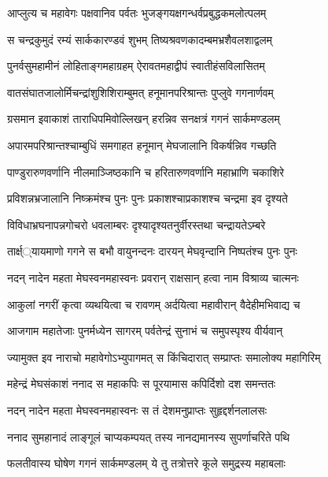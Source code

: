 
\twolineshloka
{आप्लुत्य च महावेगः पक्षवानिव पर्वतः}
{भुजङ्गयक्षगन्धर्वप्रबुद्धकमलोत्पलम्} %

\twolineshloka
{स चन्द्रकुमुदं रम्यं सार्ककारण्डवं शुभम्}
{तिष्यश्रवणकादम्बमभ्रशैवलशाद्वलम्} %

\twolineshloka
{पुनर्वसुमहामीनं लोहिताङ्गमहाग्रहम्}
{ऐरावतमहाद्वीपं स्वातीहंसविलासितम्} %

\twolineshloka
{वातसंघातजालोर्मिचन्द्रांशुशिशिराम्बुमत्}
{हनूमानपरिश्रान्तः पुप्लुवे गगनार्णवम्} %

\twolineshloka
{ग्रसमान इवाकाशं ताराधिपमिवोल्लिखन्}
{हरन्निव सनक्षत्रं गगनं सार्कमण्डलम्} %

\twolineshloka
{अपारमपरिश्रान्तश्चाम्बुधिं समगाहत}
{हनूमान् मेघजालानि विकर्षन्निव गच्छति} %

\twolineshloka
{पाण्डुरारुणवर्णानि नीलमाञ्जिष्ठकानि च}
{हरितारुणवर्णानि महाभ्राणि चकाशिरे} %

\twolineshloka
{प्रविशन्नभ्रजालानि निष्क्रमंश्च पुनः पुनः}
{प्रकाशश्चाप्रकाशश्च चन्द्रमा इव दृश्यते} %

\twolineshloka
{विविधाभ्रघनापन्नगोचरो धवलाम्बरः}
{दृश्यादृश्यतनुर्वीरस्तथा चन्द्रायतेऽम्बरे} %

\twolineshloka
{तार्क्ष््यायमाणो गगने स बभौ वायुनन्दनः}
{दारयन् मेघवृन्दानि निष्पतंश्च पुनः पुनः} %

\twolineshloka
{नदन् नादेन महता मेघस्वनमहास्वनः}
{प्रवरान् राक्षसान् हत्वा नाम विश्राव्य चात्मनः} %

\twolineshloka
{आकुलां नगरीं कृत्वा व्यथयित्वा च रावणम्}
{अर्दयित्वा महावीरान् वैदेहीमभिवाद्य च} %

\twolineshloka
{आजगाम महातेजाः पुनर्मध्येन सागरम्}
{पर्वतेन्द्रं सुनाभं च समुपस्पृश्य वीर्यवान्} %

\twolineshloka
{ज्यामुक्त इव नाराचो महावेगोऽभ्युपागमत्}
{स किंचिदारात् सम्प्राप्तः समालोक्य महागिरिम्} %

\twolineshloka
{महेन्द्रं मेघसंकाशं ननाद स महाकपिः}
{स पूरयामास कपिर्दिशो दश समन्ततः} %

\twolineshloka
{नदन् नादेन महता मेघस्वनमहास्वनः}
{स तं देशमनुप्राप्तः सुहृद्दर्शनलालसः} %

\twolineshloka
{ननाद सुमहानादं लाङ्गूलं चाप्यकम्पयत्}
{तस्य नानद्यमानस्य सुपर्णाचरिते पथि} %

\twolineshloka
{फलतीवास्य घोषेण गगनं सार्कमण्डलम्}
{ये तु तत्रोत्तरे कूले समुद्रस्य महाबलाः} %

